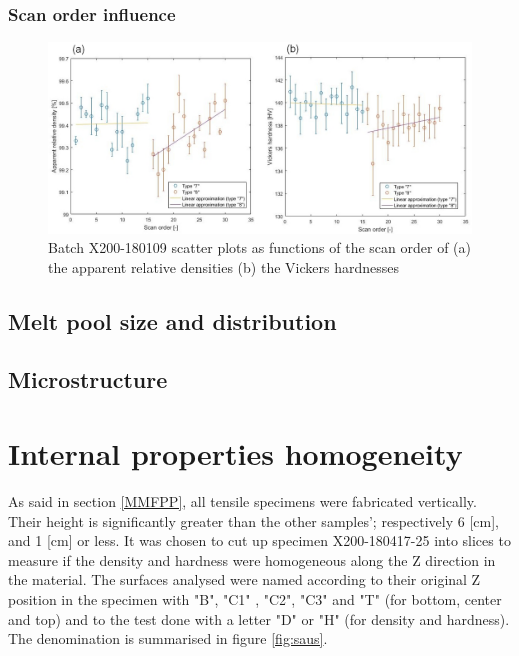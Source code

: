 \subsubsection{Scan order influence}


\begin{figure}[ht]
\centering
\centerline{\includegraphics[scale=0.62]{Images/180109-SO}}
\decoRule
\caption[Batch X200-180109 scatter plots as functions of the scan order of (a) the apparent relative densities (b) the Vickers hardnesses]{Batch X200-180109 scatter plots as functions of the scan order of (a) the apparent relative densities (b) the Vickers hardnesses}
\label{fig:180109-SO}
\end{figure} 

\subsection{Melt pool size and distribution}

\subsection{Microstructure}

\section{Internal properties homogeneity}
As said in section \ref{MMFPP}, all tensile specimens were fabricated vertically. Their height is significantly greater than the other samples'; respectively 6 [cm], and 1 [cm] or less. It was chosen to cut up specimen X200-180417-25 into slices to measure if the density and hardness were homogeneous along the Z direction in the material. The surfaces analysed were named according to their original Z position in the specimen with "B", "C1" , "C2", "C3" and "T" (for bottom, center and top) and to the test done with a letter "D" or "H"  (for density and hardness). The denomination is summarised in figure \ref{fig:saus}.\\

